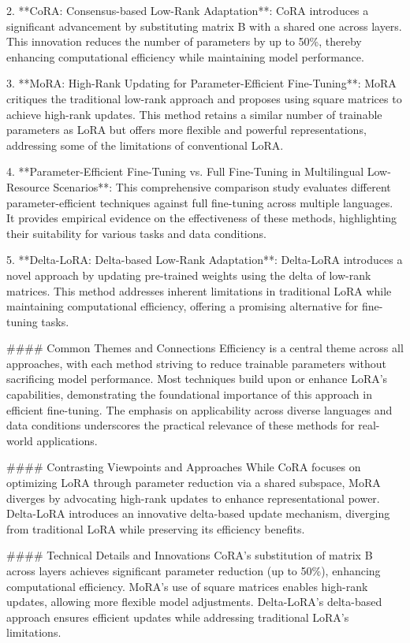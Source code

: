 \documentclass[conference]{IEEEtran}
\begin{document}
2. **CoRA: Consensus-based Low-Rank Adaptation**: CoRA introduces a significant advancement by substituting matrix B with a shared one across layers. This innovation reduces the number of parameters by up to 50\%, thereby enhancing computational efficiency while maintaining model performance.

3. **MoRA: High-Rank Updating for Parameter-Efficient Fine-Tuning**: MoRA critiques the traditional low-rank approach and proposes using square matrices to achieve high-rank updates. This method retains a similar number of trainable parameters as LoRA but offers more flexible and powerful representations, addressing some of the limitations of conventional LoRA.

4. **Parameter-Efficient Fine-Tuning vs. Full Fine-Tuning in Multilingual Low-Resource Scenarios**: This comprehensive comparison study evaluates different parameter-efficient techniques against full fine-tuning across multiple languages. It provides empirical evidence on the effectiveness of these methods, highlighting their suitability for various tasks and data conditions.

5. **Delta-LoRA: Delta-based Low-Rank Adaptation**: Delta-LoRA introduces a novel approach by updating pre-trained weights using the delta of low-rank matrices. This method addresses inherent limitations in traditional LoRA while maintaining computational efficiency, offering a promising alternative for fine-tuning tasks.

#### Common Themes and Connections
Efficiency is a central theme across all approaches, with each method striving to reduce trainable parameters without sacrificing model performance. Most techniques build upon or enhance LoRA's capabilities, demonstrating the foundational importance of this approach in efficient fine-tuning. The emphasis on applicability across diverse languages and data conditions underscores the practical relevance of these methods for real-world applications.

#### Contrasting Viewpoints and Approaches
While CoRA focuses on optimizing LoRA through parameter reduction via a shared subspace, MoRA diverges by advocating high-rank updates to enhance representational power. Delta-LoRA introduces an innovative delta-based update mechanism, diverging from traditional LoRA while preserving its efficiency benefits.

#### Technical Details and Innovations
CoRA's substitution of matrix B across layers achieves significant parameter reduction (up to 50\%), enhancing computational efficiency. MoRA's use of square matrices enables high-rank updates, allowing more flexible model adjustments. Delta-LoRA's delta-based approach ensures efficient updates while addressing traditional LoRA's limitations.
\end{document}

